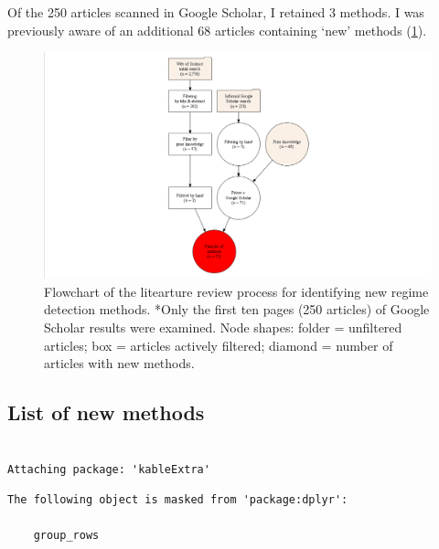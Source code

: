 \documentclass[12pt,twoside,openany]{reedthesis}
\begin{document}
Of the 250 articles scanned in Google Scholar, I retained 3 methods. I was previously aware of an additional 68 articles containing `new' methods (\ref{fig:rdmReviewFlow}).
\begin{figure}
\includegraphics[width=18.31in]{./chapterFiles/rdmReview/figures/figsCalledInDiss/myDiagraph} \caption{Flowchart of the litearture review process for identifying new regime detection methods. *Only the first ten pages (250 articles) of Google Scholar results were examined. Node shapes: folder = unfiltered articles; box = articles actively filtered; diamond = number of articles with new methods.}\label{fig:rdmReviewFlow}
\end{figure}
\hypertarget{list-of-new-methods}{%
\subsection{List of new methods}\label{list-of-new-methods}}
\begin{verbatim}

Attaching package: 'kableExtra'
\end{verbatim}
\begin{verbatim}
The following object is masked from 'package:dplyr':

    group_rows
\end{verbatim}
\end{document}
